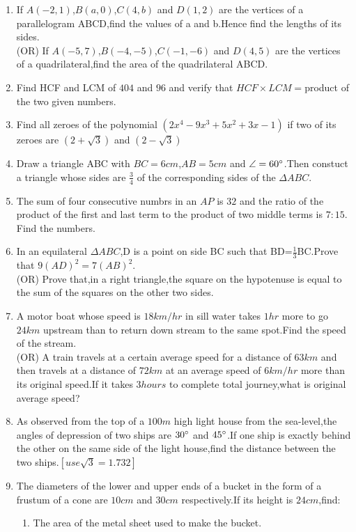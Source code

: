 \documentclass{article}
\begin{document}
\begin{enumerate}
	\item If $A(-2,1)$,$B(a,0)$,$C(4,b)$ and $D(1,2)$ are the vertices of a parallelogram ABCD,find the values of a and b.Hence find the lengths of its sides.\\
		(OR)
		If $A(-5,7)$,$B(-4,-5)$,$C(-1,-6)$ and $D(4,5)$ are the vertices of a quadrilateral,find the area of the quadrilateral ABCD.
	\item Find HCF and LCM of $404$ and $96$ and verify that $HCF \times LCM=$product of the two given numbers.
	\item Find all zeroes of the polynomial $(2x^4-9x^3+5x^2+3x-1)$ if two of its zeroes are $(2+\sqrt3)$ and $(2-\sqrt3)$
	\item Draw a triangle ABC with $BC=6cm$,$AB=5cm$ and $\angle=60\degree$.Then constuct a triangle whose sides are $\frac{3}{4}$ of the corresponding sides of the $\Delta ABC$.
	\item The sum of four consecutive numbrs in an $AP$ is $32$ and the ratio of the product of the first and last term to the product of two middle terms is $7:15$. Find the numbers.
	\item In an equilateral $\Delta ABC$,D is a point on side BC such that BD=$\frac{1}{3}$BC.Prove that $9(AD)^2=7(AB)^2$.\\
		(OR)
		Prove that,in a right triangle,the square on the hypotenuse is equal to the sum of the squares on the other two sides.
	\item A motor boat whose speed is $18km/hr$ in sill water takes $1hr$ more to go $24km$ upstream than to return down stream to the same spot.Find the speed of the stream.\\
		(OR)
		A train travels at a certain average speed for a distance of $63km$ and then travels at a distance of $72km$ at an average speed of $6km/hr$ more than its original speed.If it takes $3 hours$ to complete total journey,what is original average speed?
	\item As observed from the top of a $100m$ high light house from the sea-level,the angles of depression of two ships are $30\degree$ and $45\degree$.If one ship is exactly behind the other on the same side of the light house,find the distance between the two ships.$[use \sqrt3=1.732]$
	\item The diameters of the lower and upper ends of a bucket in the form of a frustum of a cone are $10cm$ and $30cm$ respectively.If its height is $24cm$,find:
		\begin{enumerate}[label=\roman*)]
			\item The area of the metal sheet used to make the bucket.

\end{enumerate}
\end{enumerate}
\end{document}
